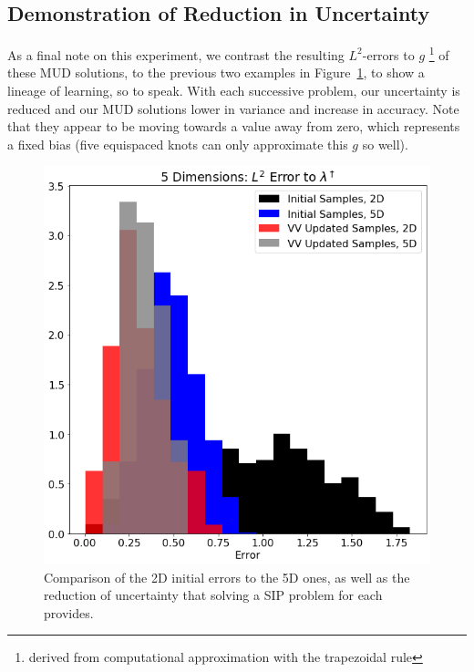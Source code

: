 \subsection{Demonstration of Reduction in Uncertainty}
As a final note on this experiment, we contrast the resulting $L^2$-errors to $g$ \footnote{derived from computational approximation with the trapezoidal rule} of these MUD solutions, to the previous two examples in Figure~\ref{fig:pde-highd-5d-hist}, to show a lineage of learning, so to speak.
With each successive problem, our uncertainty is reduced and our MUD solutions lower in variance and increase in accuracy.
Note that they appear to be moving towards a value away from zero, which represents a fixed bias (five equispaced knots can only approximate this $g$ so well).

\begin{figure}
\centering
  \includegraphics[width=0.675\linewidth]{figures/pde-highd/pde-highd_hist_D5_t5-0E-01}
\caption{
Comparison of the 2D initial errors to the 5D ones, as well as the reduction of uncertainty that solving a SIP problem for each provides.
}
\label{fig:pde-highd-5d-hist}
\end{figure}
